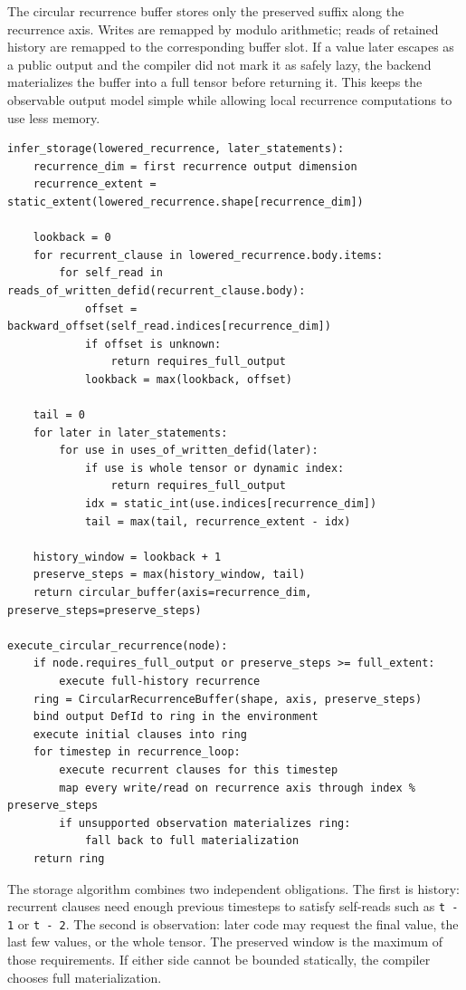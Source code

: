 The circular recurrence buffer stores only the preserved suffix along the
recurrence axis. Writes are remapped by modulo arithmetic; reads of retained
history are remapped to the corresponding buffer slot. If a value later escapes
as a public output and the compiler did not mark it as safely lazy, the backend
materializes the buffer into a full tensor before returning it. This keeps the
observable output model simple while allowing local recurrence computations to
use less memory.

\begin{lstlisting}[style=pythoncode,caption={Finite-window recurrence-storage inference.}]
infer_storage(lowered_recurrence, later_statements):
    recurrence_dim = first recurrence output dimension
    recurrence_extent = static_extent(lowered_recurrence.shape[recurrence_dim])

    lookback = 0
    for recurrent_clause in lowered_recurrence.body.items:
        for self_read in reads_of_written_defid(recurrent_clause.body):
            offset = backward_offset(self_read.indices[recurrence_dim])
            if offset is unknown:
                return requires_full_output
            lookback = max(lookback, offset)

    tail = 0
    for later in later_statements:
        for use in uses_of_written_defid(later):
            if use is whole tensor or dynamic index:
                return requires_full_output
            idx = static_int(use.indices[recurrence_dim])
            tail = max(tail, recurrence_extent - idx)

    history_window = lookback + 1
    preserve_steps = max(history_window, tail)
    return circular_buffer(axis=recurrence_dim, preserve_steps=preserve_steps)

execute_circular_recurrence(node):
    if node.requires_full_output or preserve_steps >= full_extent:
        execute full-history recurrence
    ring = CircularRecurrenceBuffer(shape, axis, preserve_steps)
    bind output DefId to ring in the environment
    execute initial clauses into ring
    for timestep in recurrence_loop:
        execute recurrent clauses for this timestep
        map every write/read on recurrence axis through index % preserve_steps
        if unsupported observation materializes ring:
            fall back to full materialization
    return ring
\end{lstlisting}

The storage algorithm combines two independent obligations. The first is
history: recurrent clauses need enough previous timesteps to satisfy self-reads
such as \texttt{t - 1} or \texttt{t - 2}. The second is observation: later code
may request the final value, the last few values, or the whole tensor. The
preserved window is the maximum of those requirements. If either side cannot be
bounded statically, the compiler chooses full materialization.

